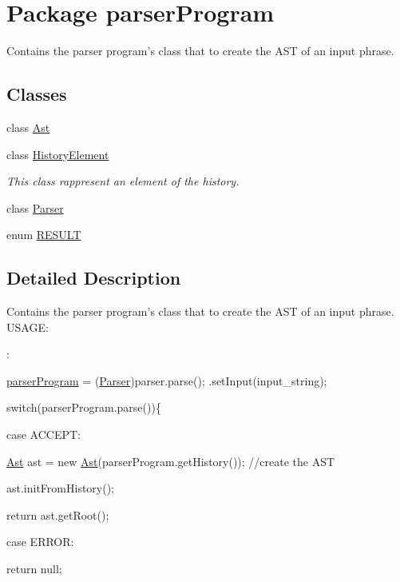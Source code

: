 \hypertarget{namespaceparser_program}{\section{Package parser\-Program}
\label{namespaceparser_program}
}


Contains the parser program's class that to create the A\-S\-T of an input phrase.  


\subsection*{Classes}
\begin{DoxyCompactItemize}
\item 
class \hyperlink{classparser_program_1_1_ast}{Ast}
\item 
class \hyperlink{classparser_program_1_1_history_element}{History\-Element}
\begin{DoxyCompactList}\small\item\em This class rappresent an element of the history. \end{DoxyCompactList}\item 
class \hyperlink{classparser_program_1_1_parser}{Parser}
\item 
enum \hyperlink{enumparser_program_1_1_r_e_s_u_l_t}{R\-E\-S\-U\-L\-T}
\end{DoxyCompactItemize}


\subsection{Detailed Description}
Contains the parser program's class that to create the A\-S\-T of an input phrase. U\-S\-A\-G\-E\-:\par
 \-:\par
  \hyperlink{namespaceparser_program}{parser\-Program} = (\hyperlink{classparser_program_1_1_parser}{Parser})parser.\-parse(); .set\-Input(input\-\_\-string); \par
 switch(parser\-Program.\-parse())\{ \par
 case A\-C\-C\-E\-P\-T\-: \par
 \hyperlink{classparser_program_1_1_ast}{Ast} ast = new \hyperlink{classparser_program_1_1_ast}{Ast}(parser\-Program.\-get\-History()); //create the A\-S\-T \par
 ast.\-init\-From\-History(); \par
 return ast.\-get\-Root(); \par
 case E\-R\-R\-O\-R\-: \par
 return null; 